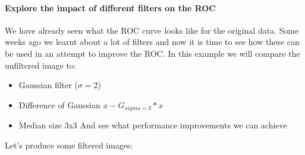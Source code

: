 \documentclass[letterpaper,10pt,english]{sphinxmanual}
\begin{document}
\noindent{}


\paragraph{Explore the impact of different filters on the ROC}
\label{\detokenize{04-BasicSegmentation_Part2:explore-the-impact-of-different-filters-on-the-roc}}
\sphinxAtStartPar
We have already seen what the ROC curve looks like for the original data. Some weeks ago we learnt about a lot of filters and now it is time to see how these can be used in an attempt to improve the ROC. In this example we will compare the unfiltered image to:
\begin{itemize}
\item {} 
\sphinxAtStartPar
Gaussian filter (\(\sigma=2\))

\item {} 
\sphinxAtStartPar
Difference of Gaussian \(x-G_{sigma=3}*x\)

\item {} 
\sphinxAtStartPar
Median size 3x3
And see what performance improvements we can achieve

\end{itemize}

\sphinxAtStartPar
Let’s produce some filtered images:
\end{document}

